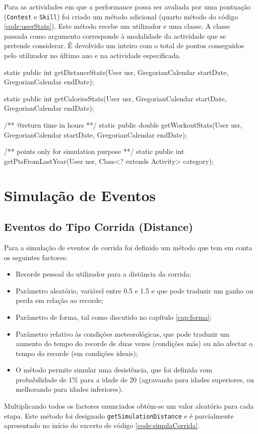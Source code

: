 \documentclass[a4paper,10pt]{report}
\begin{document}
Para as actividades em que a performance possa ser avaliada por uma pontuação (\verb!Contest! e \verb!Skill!) foi criado um método adicional 
(quarto método do código \ref{code:userStats}).
Este método recebe um utilizador e uma classe. A classe passada como argumento corresponde à modalidade da actividade que se pretende considerar. 
É devolvido um inteiro com o total de pontos conseguidos pelo utilizador no último ano e na actividade especificada.

\begin{code}[caption=Métodos para cálculo de estatísticas (src/core/UserStats)., label=code:userStats]
static public int getDistanceStats(User usr, GregorianCalendar startDate, GregorianCalendar endDate);

static public int getCaloriesStats(User usr, GregorianCalendar startDate, GregorianCalendar endDate);

/** @return time in hours **/
static public double getWorkoutStats(User usr, GregorianCalendar startDate, GregorianCalendar endDate);
  
/** points only for simulation purpose **/
static public int getPtsFromLastYear(User usr, Class<? extends Activity> category);
\end{code}

\newpage
\phantom{placeholder} %
\thispagestyle{empty} %
\chapter{Simulação de Eventos}
\label{cap:simula}
\section{Eventos do Tipo Corrida (Distance)}
\label{sec:simulaCorrida}
Para a simulação de eventos de corrida foi definido um método que tem em conta os seguintes factores:
\begin{itemize}
 \item Recorde pessoal do utilizador para a distância da corrida;
 \item Parâmetro aleatório, variável entre 0.5 e 1.5 e que pode traduzir um ganho ou perda em relação ao recorde;
 \item Parâmetro de forma, tal como discutido no capítulo \ref{cap:forma};
 \item Parâmetro relativo às condições meteorológicas, que pode traduzir um aumento do tempo do recorde de duas vezes (condições más)
	  ou não afectar o tempo do recorde (em condições ideais);
 \item O método permite simular uma desistência, que foi definida com probabilidade de 1\% para a idade de 20 (agravando para idades superiores, 
	  ou melhorando para idades inferiores).
\end{itemize}
Multiplicando todos os factores enunciados obtém-se um valor aleatório para cada etapa.
Este método foi designado \verb!getSimulationDistance! e é parcialmente apresentado no início do excerto de código \ref{code:simulaCorrida}.
\end{document}
